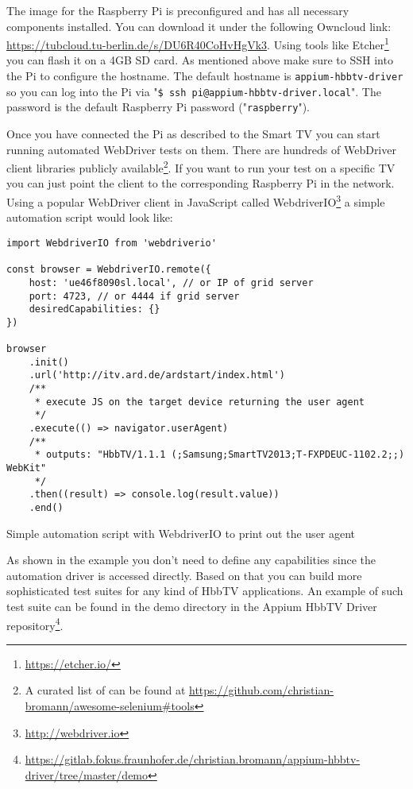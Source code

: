 The image for the Raspberry Pi is preconfigured and has all necessary components installed. You can download it under the following Owncloud link: \url{https://tubcloud.tu-berlin.de/s/DU6R40CoHvHgVk3}. Using tools like Etcher\footnote{\url{https://etcher.io/}} you can flash it on a 4GB SD card. As mentioned above make sure to SSH into the Pi to configure the hostname. The default hostname is \texttt{appium-hbbtv-driver} so you can log into the Pi via "\texttt{\$ ssh pi@appium-hbbtv-driver.local}". The password is the default Raspberry Pi password ("\texttt{raspberry}").

Once you have connected the Pi as described to the Smart TV you can start running automated WebDriver tests on them. There are hundreds of WebDriver client libraries publicly available\footnote{A curated list of can be found at \url{https://github.com/christian-bromann/awesome-selenium\#tools}}. If you want to run your test on a specific TV you can just point the client to the corresponding Raspberry Pi in the network. Using a popular WebDriver client in JavaScript called WebdriverIO\footnote{\url{http://webdriver.io}} a simple automation script would look like:

\begin{listing}[H]
\begin{verbatim}
import WebdriverIO from 'webdriverio'

const browser = WebdriverIO.remote({
    host: 'ue46f8090sl.local', // or IP of grid server
    port: 4723, // or 4444 if grid server
    desiredCapabilities: {}
})

browser
    .init()
    .url('http://itv.ard.de/ardstart/index.html')
    /**
     * execute JS on the target device returning the user agent
     */
    .execute(() => navigator.userAgent)
    /**
     * outputs: "HbbTV/1.1.1 (;Samsung;SmartTV2013;T-FXPDEUC-1102.2;;) WebKit"
     */
    .then((result) => console.log(result.value))
    .end()
\end{verbatim}
\caption{Simple automation script with WebdriverIO to print out the user agent}
\label{lst:wdioExample}
\end{listing}

As shown in the example you don't need to define any capabilities since the automation driver is accessed directly. Based on that you can build more sophisticated test suites for any kind of HbbTV applications. An example of such test suite can be found in the demo directory in the Appium HbbTV Driver repository\footnote{\url{https://gitlab.fokus.fraunhofer.de/christian.bromann/appium-hbbtv-driver/tree/master/demo}}.

